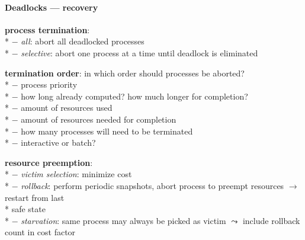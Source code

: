 \paragraph{Deadlocks --- recovery}
\begin{items}
  \item \textbf{process termination}: \\*
    $ - $ \emph{all}: abort all deadlocked processes \\*
    $ - $ \emph{selective}: abort one process at a time until deadlock is eliminated
  \item \textbf{termination order}: in which order should processes be aborted? \\*
    $ - $ process priority \\*
    $ - $ how long already computed? how much longer for completion? \\*
    $ - $ amount of resources used \\*
    $ - $ amount of resources needed for completion \\*
    $ - $ how many processes will need to be terminated \\*
    $ - $ interactive or batch?
  \item \textbf{resource preemption}: \\*
    $ - $ \emph{victim selection}: minimize cost \\*
    $ - $ \emph{rollback}: perform periodic snapshots, abort process to preempt resources $ \to $ restart from last \\* \phantom{$ - $} \phantom{$ \cdot $} safe state \\*
    $ - $ \emph{starvation}: same process may always be picked as victim $ \leadsto $ include rollback count in cost factor
\end{items}